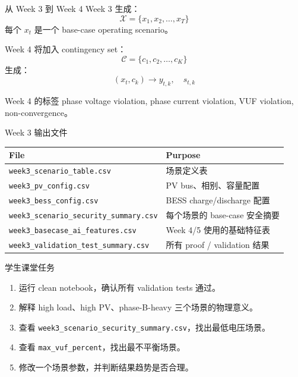 \documentclass[aspectratio=169,11pt]{beamer}
\begin{document}
\begin{frame}{从 Week 3 到 Week 4}
Week 3 生成：
\[
\mathcal{X}=\{x_1,x_2,\ldots,x_T\}
\]
每个 $x_t$ 是一个 base-case operating scenario。

Week 4 将加入 contingency set：
\[
\mathcal{C}=\{c_1,c_2,\ldots,c_K\}
\]
生成：
\[
(x_t,c_k) \rightarrow y_{t,k},\quad s_{t,k}
\]
\begin{block}{Week 4 的标签}
phase voltage violation, phase current violation, VUF violation, non-convergence。
\end{block}
\end{frame}

\begin{frame}{Week 3 输出文件}
\begin{table}
\centering
\scriptsize
\begin{tabular}{ll}
\toprule
File & Purpose \\
\midrule
\texttt{week3\_scenario\_table.csv} & 场景定义表 \\
\texttt{week3\_pv\_config.csv} & PV bus、相别、容量配置 \\
\texttt{week3\_bess\_config.csv} & BESS charge/discharge 配置 \\
\texttt{week3\_scenario\_security\_summary.csv} & 每个场景的 base-case 安全摘要 \\
\texttt{week3\_basecase\_ai\_features.csv} & Week 4/5 使用的基础特征表 \\
\texttt{week3\_validation\_test\_summary.csv} & 所有 proof / validation 结果 \\
\bottomrule
\end{tabular}
\end{table}
\end{frame}

\begin{frame}{学生课堂任务}
\begin{enumerate}
  \item 运行 clean notebook，确认所有 validation tests 通过。
  \item 解释 high load、high PV、phase-B-heavy 三个场景的物理意义。
  \item 查看 \texttt{week3\_scenario\_security\_summary.csv}，找出最低电压场景。
  \item 查看 \texttt{max\_vuf\_percent}，找出最不平衡场景。
  \item 修改一个场景参数，并判断结果趋势是否合理。
\end{enumerate}
\end{frame}
\end{document}
